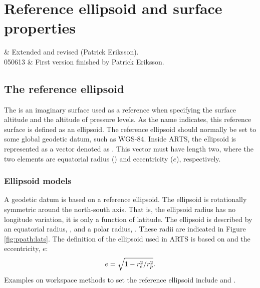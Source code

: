 \chapter{Reference ellipsoid and surface properties}
 \label{sec:surface}


 & Extended and revised (Patrick Eriksson). \\
  050613 & First version finished by Patrick Eriksson. \\
\stophistory


\graphicspath{{Figs/ppath/}}


\section{The reference ellipsoid}
\label{sec:fm_defs:geoid}

The  is an imaginary surface used as a reference when
specifying the surface altitude and the altitude of pressure levels. As the
name indicates, this reference surface is defined as an ellipsoid. The
reference ellipsoid should normally be set to some global geodetic datum, such
as WGS-84.
Inside ARTS, the ellipsoid is represented as a vector denoted as
. This vector must have length two, where the two
elements are equatorial radius () and eccentricity ($e$), respectively.




\subsection{Ellipsoid models}
\label{sec:ppath:geoid}

A geodetic datum is based on a reference ellipsoid. The ellipsoid is
rotationally symmetric around the north-south axis. That is, the ellipsoid
radius has no longitude variation, it is only a function of latitude. The
ellipsoid is described by an equatorial radius, , and a polar radius,
. These radii are indicated in Figure \ref{fig:ppath:lats}. The
definition of the ellipsoid used in ARTS is based on  and the
eccentricity, $e$:
\begin{equation}
 e = \sqrt{1-r_{e}^2/r_{p}^2}.
 \label{eq:ppath:eccentricity} 
\end{equation}
Examples on workspace methods to set the reference ellipsoid include 
 and .

